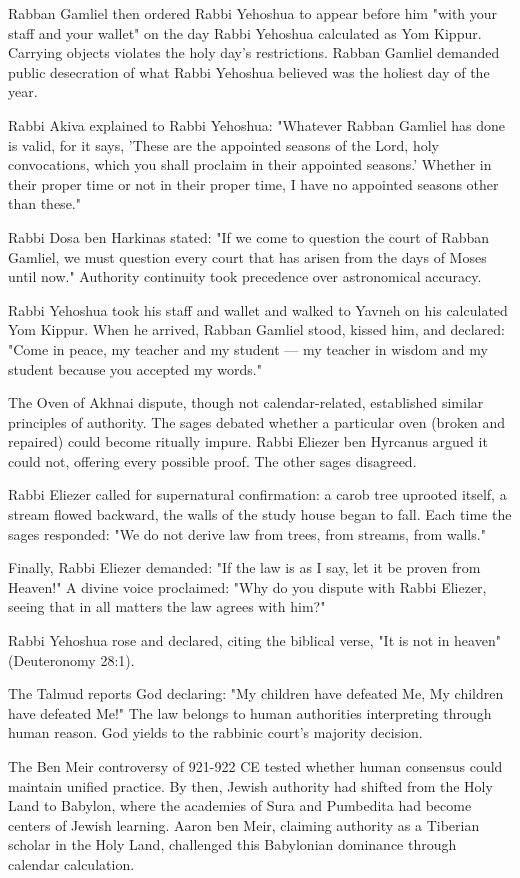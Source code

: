Rabban Gamliel then ordered Rabbi Yehoshua to appear before him "with your staff and your wallet" on the day Rabbi Yehoshua calculated as Yom Kippur. Carrying objects violates the holy day's restrictions. Rabban Gamliel demanded public desecration of what Rabbi Yehoshua believed was the holiest day of the year.

Rabbi Akiva explained to Rabbi Yehoshua: "Whatever Rabban Gamliel has done is valid, for it says, 'These are the appointed seasons of the Lord, holy convocations, which you shall proclaim in their appointed seasons.' Whether in their proper time or not in their proper time, I have no appointed seasons other than these."

Rabbi Dosa ben Harkinas stated: "If we come to question the court of Rabban Gamliel, we must question every court that has arisen from the days of Moses until now." Authority continuity took precedence over astronomical accuracy.

Rabbi Yehoshua took his staff and wallet and walked to Yavneh on his calculated Yom Kippur. When he arrived, Rabban Gamliel stood, kissed him, and declared: "Come in peace, my teacher and my student — my teacher in wisdom and my student because you accepted my words."

The Oven of Akhnai dispute, though not calendar-related, established similar principles of authority. The sages debated whether a particular oven (broken and repaired) could become ritually impure. Rabbi Eliezer ben Hyrcanus argued it could not, offering every possible proof. The other sages disagreed.

Rabbi Eliezer called for supernatural confirmation: a carob tree uprooted itself, a stream flowed backward, the walls of the study house began to fall. Each time the sages responded: "We do not derive law from trees, from streams, from walls."

Finally, Rabbi Eliezer demanded: "If the law is as I say, let it be proven from Heaven!" A divine voice proclaimed: "Why do you dispute with Rabbi Eliezer, seeing that in all matters the law agrees with him?"

Rabbi Yehoshua rose and declared, citing the biblical verse, "It is not in heaven" (Deuteronomy 28:1).

The Talmud reports God declaring: "My children have defeated Me, My children have defeated Me!" The law belongs to human authorities interpreting through human reason. God yields to the rabbinic court's majority decision.

The Ben Meir controversy of 921-922 CE tested whether human consensus could maintain unified practice. By then, Jewish authority had shifted from the Holy Land to Babylon, where the academies of Sura and Pumbedita had become centers of Jewish learning. Aaron ben Meir, claiming authority as a Tiberian scholar in the Holy Land, challenged this Babylonian dominance through calendar calculation.


